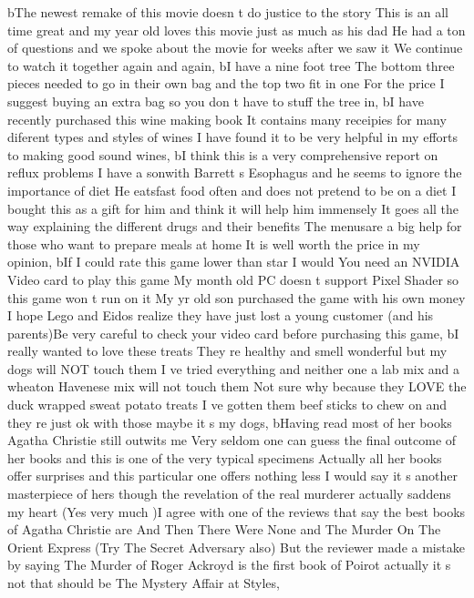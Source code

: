 \documentclass[
]{article}
\newenvironment{Shaded}{}{}
\newcommand{\NormalTok}[1]{#1}
\newcommand{\StringTok}[1]{\textcolor[rgb]{0.25,0.44,0.63}{#1}}
\begin{document}
\begin{Shaded}
\begin{Highlighting}[]
\NormalTok{       b}\StringTok{\textquotesingle{}The newest remake of this movie doesn t do justice to the story This is an all time great and my year old loves this movie just as much as his dad He had a ton of questions and we spoke about the movie for weeks after we saw it We continue to watch it together again and again\textquotesingle{}}\NormalTok{,}
\NormalTok{       b}\StringTok{\textquotesingle{}I have a nine foot tree The bottom three pieces needed to go in their own bag and the top two fit in one For the price I suggest buying an extra bag so you don t have to stuff the tree in\textquotesingle{}}\NormalTok{,}
\NormalTok{       b}\StringTok{\textquotesingle{}I have recently purchased this wine making book It contains many receipies for many diferent types and styles of wines I have found it to be very helpful in my efforts to making good sound wines\textquotesingle{}}\NormalTok{,}
\NormalTok{       b}\StringTok{\textquotesingle{}I think this is a very comprehensive report on reflux problems I have a sonwith Barrett s Esophagus and he seems to ignore the importance of diet He eatsfast food often and does not pretend to be on a diet I bought this as a gift for him and think it will help him immensely It goes all the way explaining the different drugs and their benefits The menusare a big help for those who want to prepare meals at home It is well worth the price in my opinion\textquotesingle{}}\NormalTok{,}
\NormalTok{       b}\StringTok{\textquotesingle{}If I could rate this game lower than star I would You need an NVIDIA Video card to play this game My month old PC doesn t support Pixel Shader so this game won t run on it My yr old son purchased the game with his own money I hope Lego and Eidos realize they have just lost a young customer (and his parents)Be very careful to check your video card before purchasing this game\textquotesingle{}}\NormalTok{,}
\NormalTok{       b}\StringTok{\textquotesingle{}I really wanted to love these treats They re healthy and smell wonderful but my dogs will NOT touch them I ve tried everything and neither one a lab mix and a wheaton Havenese mix will not touch them Not sure why because they LOVE the duck wrapped sweat potato treats I ve gotten them beef sticks to chew on and they re just ok with those maybe it s my dogs\textquotesingle{}}\NormalTok{,}
\NormalTok{       b}\StringTok{\textquotesingle{}Having read most of her books Agatha Christie still outwits me Very seldom one can guess the final outcome of her books and this is one of the very typical specimens Actually all her books offer surprises and this particular one offers nothing less I would say it s another masterpiece of hers though the revelation of the real murderer actually saddens my heart (Yes very much )I agree with one of the reviews that say the best books of Agatha Christie are And Then There Were None and The Murder On The Orient Express (Try The Secret Adversary also) But the reviewer made a mistake by saying The Murder of Roger Ackroyd is the first book of Poirot actually it s not that should be The Mystery Affair at Styles\textquotesingle{}}\NormalTok{,}

\end{Highlighting}
\end{Shaded}
\end{document}
